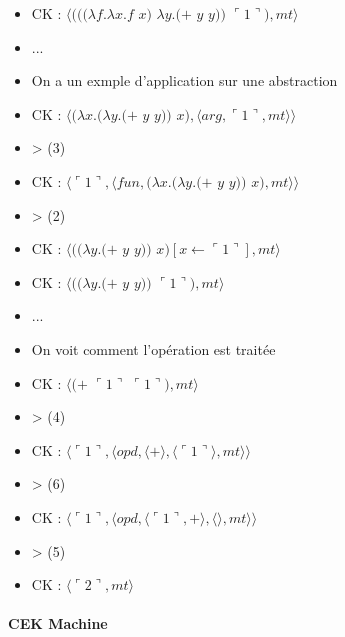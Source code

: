 \documentclass[10pt,a4paper]{article}
\begin{document}
				\begin{multicols}{2}\raggedright{
						\begin{itemize}
							\item[] CK : $\langle(((\lambda f.\lambda x.f$ $x)$ $\lambda y.(+$ $y$ $y))$ $\ulcorner 1\urcorner),mt\rangle$
							\item[] ...
							\item[] On a un exmple d'application sur une abstraction
							\item[] CK : $\langle(\lambda x.(\lambda y.(+$ $y$ $y))$ $x),\langle arg,\ulcorner 1\urcorner,mt\rangle\rangle$	
							\item[] > (3) 
							\item[] CK : $\langle\ulcorner 1\urcorner,\langle fun,(\lambda x.(\lambda y.(+$ $y$ $y))$ $x),mt\rangle\rangle$
							\item[] > (2) 
							\item[] CK : $\langle((\lambda y.(+$ $y$ $y))$ $x)[x \leftarrow \ulcorner 1\urcorner ],mt\rangle$
							\item[] CK : $\langle((\lambda y.(+$ $y$ $y))$ $\ulcorner 1\urcorner),mt\rangle$
						\end{itemize}
						
						\begin{itemize}
							\item[] ...
							\item[] On voit comment l'opération est traitée
							\item[] CK : $\langle(+$ $\ulcorner 1\urcorner$ $\ulcorner 1\urcorner),mt\rangle$
							\item[] > (4)
							\item[] CK : $\langle\ulcorner 1\urcorner,\langle opd,\langle + \rangle,\langle\ulcorner 1\urcorner\rangle,mt\rangle\rangle$
							\item[] > (6) 
							\item[] CK : $\langle\ulcorner 1\urcorner,\langle opd,\langle\ulcorner 1\urcorner,+ \rangle,\langle\rangle,mt\rangle\rangle$
							\item[] > (5) 
							\item[] CK : $\langle\ulcorner 2\urcorner,mt\rangle$
						\end{itemize}
					}
				\end{multicols}
				\newpage
				
				
				
			\paragraph{CEK Machine}
		
\end{document}

